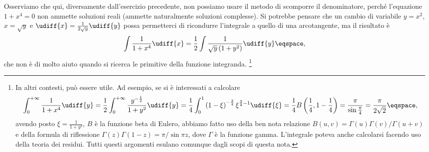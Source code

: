 \begin{Solution}
Osserviamo che qui, diversamente dall'esercizio precedente, non possiamo usare il metodo di scomporre il denominatore,
perch\'e l'equazione $1+x^{4} = 0$ non ammette soluzioni reali (ammette
naturalmente soluzioni complesse).
Si potrebbe pensare che un cambio di variabile $y = x^{2}$, $x = \sqrt{y} $ e
$\udiff{x} = \frac{1}{2\sqrt{y}} \udiff{y} $ possa permetterci di ricondurre
l'integrale a quello di una arcotangente, ma il risultato \`e
\begin{displaymath}
\int \frac{1}{1+x^{4}} \udiff{x} = \frac{1}{2} \int \frac{1}{\sqrt{y} \left( 1+
y^{2}\right) } \udiff{y} \eqspace ,
\end{displaymath}
che non \`e di molto aiuto quando si ricerca le primitive della funzione
integranda.%
\footnote{In altri contesti, pu\`o essere utile.
Ad esempio, se si \`e interessati a calcolare
\begin{displaymath}
\int_{0}^{+\infty} \frac{1}{1+x^{4}}  \udiff{y} = \frac{1}{2} \int_{0}^{+\infty}
\frac{y^{-\frac{1}{2}}}{1+y^{2}} \udiff{y} = \frac{1}{4} \int_{0}^{1} \left(
1 -
\xi\right)
^{-\frac{3}{4} } \xi ^{\frac{3}{4} -1} \udiff{\xi} = \frac{1}{4} B\left( \frac{1}{4} , 1 -
\frac{1}{4} \right) = \frac{\pi}{\sin \frac{\pi}{4}} =\frac{\pi}{2\sqrt{2}}\eqspace, 
\end{displaymath}
avendo posto $\xi = \frac{1}{1+y^{2}}$, $B$ \`e la funzione beta  di
Eulero, abbiamo fatto uso della ben nota relazione
$B(u,v) = \Gamma(u)\Gamma(v) / \Gamma(u+v)$ e della formula di riflessione 
$\Gamma(z) \Gamma(1-z) = \pi / \sin \pi
z$, dove $\Gamma$ \`e la funzione gamma.
L'integrale poteva anche calcolarsi facendo uso della teoria dei
residui.
Tutti questi argomenti esulano comunque dagli scopi di questa nota. }


\end{Solution}
